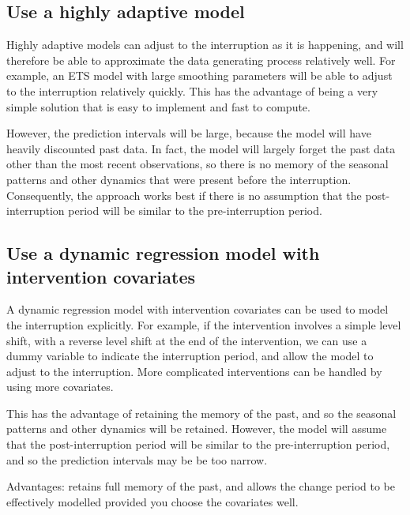 \documentclass[11pt,a4paper,]{article}
\begin{document}
\hypertarget{use-a-highly-adaptive-model}{%
\subsection{Use a highly adaptive
model}\label{use-a-highly-adaptive-model}}

Highly adaptive models can adjust to the interruption as it is
happening, and will therefore be able to approximate the data generating
process relatively well. For example, an ETS model with large smoothing
parameters will be able to adjust to the interruption relatively
quickly. This has the advantage of being a very simple solution that is
easy to implement and fast to compute.

However, the prediction intervals will be large, because the model will
have heavily discounted past data. In fact, the model will largely
forget the past data other than the most recent observations, so there
is no memory of the seasonal patterns and other dynamics that were
present before the interruption. Consequently, the approach works best
if there is no assumption that the post-interruption period will be
similar to the pre-interruption period.

\hypertarget{use-a-dynamic-regression-model-with-intervention-covariates}{%
\subsection{Use a dynamic regression model with intervention
covariates}\label{use-a-dynamic-regression-model-with-intervention-covariates}}

A dynamic regression model with intervention covariates can be used to
model the interruption explicitly. For example, if the intervention
involves a simple level shift, with a reverse level shift at the end of
the intervention, we can use a dummy variable to indicate the
interruption period, and allow the model to adjust to the interruption.
More complicated interventions can be handled by using more covariates.

This has the advantage of retaining the memory of the past, and so the
seasonal patterns and other dynamics will be retained. However, the
model will assume that the post-interruption period will be similar to
the pre-interruption period, and so the prediction intervals may be be
too narrow.

Advantages: retains full memory of the past, and allows the change
period to be effectively modelled provided you choose the covariates
well.
\end{document}

